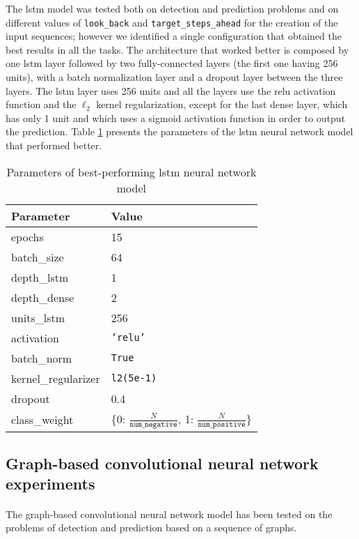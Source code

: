The \acs{lstm} model was tested both on detection and prediction problems and on different values of \texttt{look\_back} and \texttt{target\_steps\_ahead} for the creation of the input sequences; however we identified a single configuration that obtained the best results in all the tasks. The architecture that worked better is composed by one \acs{lstm} layer followed by two fully-connected layers (the first one having 256 units), with a batch normalization layer and a dropout layer between the three layers. The \acs{lstm} layer uses 256 units and all the layers use the \acs{relu} activation function and the $\ell_2$ kernel regularization, except for the last dense layer, which has only 1 unit and which uses a sigmoid activation function in order to output the prediction. Table \ref{tab:lstm_param} presents the parameters of the \acs{lstm} neural network model that performed better.
\begin{table}[htbp]
    \centering
    \begin{tabular}{ll}
        \hline
        \textbf{Parameter}  & \textbf{Value} \\\hline
        epochs              & 15 \\
        batch\_size         & 64 \\
        depth\_lstm         & 1 \\
        depth\_dense        & 2 \\
        units\_lstm         & 256 \\
        activation          & \texttt{'relu'} \\
        batch\_norm         & \texttt{True} \\
        kernel\_regularizer & \texttt{l2(5e-1)} \\
        dropout             & 0.4 \\
        class\_weight       & \{0: $\frac{N}{\texttt{num\_negative}}$, 1: $\frac{N}{\texttt{num\_positive}}$\} \\\hline
    \end{tabular}
    \caption{Parameters of best-performing \acs{lstm} neural network model}
    \label{tab:lstm_param}
\end{table}

\subsection{Graph-based convolutional neural network experiments}
\paragraph{} The graph-based convolutional neural network model has been tested on the problems of detection and prediction based on a sequence of graphs.

